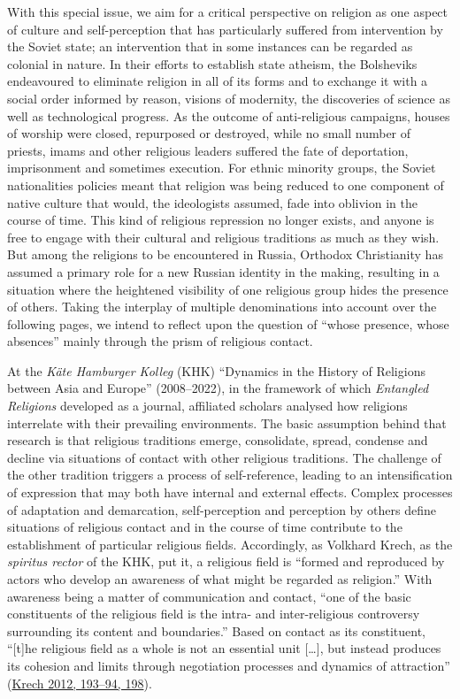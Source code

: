 \documentclass[
  english,
  a4paper,
  DIV=12,
  footlines=2.1,
  usegeometry=true]{scrartcl}
\begin{document}
\leavevmode\marginpar{\textcolor{parnum}{{[}4{]}}}With this special
issue, we aim for a critical perspective on religion as one aspect of
culture and self-perception that has particularly suffered from
intervention by the Soviet state; an intervention that in some instances
can be regarded as colonial in nature. In their efforts to establish
state atheism, the Bolsheviks endeavoured to eliminate religion in all
of its forms and to exchange it with a social order informed by reason,
visions of modernity, the discoveries of science as well as
technological progress. As the outcome of anti-religious campaigns,
houses of worship were closed, repurposed or destroyed, while no small
number of priests, imams and other religious leaders suffered the fate
of deportation, imprisonment and sometimes execution. For ethnic
minority groups, the Soviet nationalities policies meant that religion
was being reduced to one component of native culture that would, the
ideologists assumed, fade into oblivion in the course of time. This kind
of religious repression no longer exists, and anyone is free to engage
with their cultural and religious traditions as much as they wish. But
among the religions to be encountered in Russia, Orthodox Christianity
has assumed a primary role for a new Russian identity in the making,
resulting in a situation where the heightened visibility of one
religious group hides the presence of others. Taking the interplay of
multiple denominations into account over the following pages, we intend
to reflect upon the question of ``whose presence, whose absences''
mainly through the prism of religious contact.

\leavevmode\marginpar{\textcolor{parnum}{{[}5{]}}}At the \emph{Käte
Hamburger Kolleg} (KHK) ``Dynamics in the History of Religions between
Asia and Europe'' (2008--2022), in the framework of which
\emph{Entangled Religions} developed as a journal, affiliated scholars
analysed how religions interrelate with their prevailing environments.
The basic assumption behind that research is that religious traditions
emerge, consolidate, spread, condense and decline via situations of
contact with other religious traditions. The challenge of the other
tradition triggers a process of self-reference, leading to an
intensification of expression that may both have internal and external
effects. Complex processes of adaptation and demarcation,
self-perception and perception by others define situations of religious
contact and in the course of time contribute to the establishment of
particular religious fields. Accordingly, as Volkhard Krech, as the
\emph{spiritus rector} of the KHK, put it, a religious field is ``formed
and reproduced by actors who develop an awareness of what might be
regarded as religion.'' With awareness being a matter of communication
and contact, ``one of the basic constituents of the religious field is
the intra- and inter-religious controversy surrounding its content and
boundaries.'' Based on contact as its constituent, ``{[}t{]}he religious
field as a whole is not an essential unit {[}\ldots{]}, but instead
produces its cohesion and limits through negotiation processes and
dynamics of attraction''
(\protect\hyperlink{ref-krech_religious_2012}{Krech 2012, 193--94,
198}).
\end{document}
